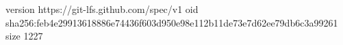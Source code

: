 version https://git-lfs.github.com/spec/v1
oid sha256:feb4e29913618886e74436f603d950e98e112b11de73e7d62ee79db6c3a99261
size 1227
